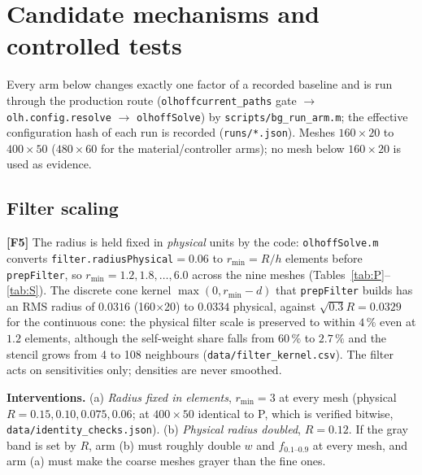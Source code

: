 \documentclass[10pt,a4paper]{article}
\newcommand{\fgray}{f_{0.1\text{--}0.9}}
\newcommand{\code}[1]{\texttt{\small #1}}
\newcommand{\fact}[1]{\textbf{[F#1]}}
\begin{document}
\section{Candidate mechanisms and controlled tests}\label{sec:mech}

Every arm below changes exactly one factor of a recorded baseline and is run through the production route (\code{olhoffcurrent\_paths} gate $\to$ \code{olh.config.resolve} $\to$ \code{olhoffSolve}) by \code{scripts/bg\_run\_arm.m}; the effective configuration hash of each run is recorded (\code{runs/*.json}). Meshes $160\times20$ to $400\times50$ ($480\times60$ for the material/controller arms); no mesh below $160\times20$ is used as evidence.

\subsection{Filter scaling}\label{sec:filter}
\fact{5} The radius is held fixed in \emph{physical} units by the code: \code{olhoffSolve.m} converts \code{filter.radiusPhysical}$=0.06$ to $r_{\min}=R/h$ elements before \code{prepFilter}, so $r_{\min}=1.2,1.8,\ldots,6.0$ across the nine meshes (Tables~\ref{tab:P}--\ref{tab:S}). The discrete cone kernel $\max(0,r_{\min}-d)$ that \code{prepFilter} builds has an RMS radius of $0.0316$ (160$\times$20) to $0.0334$ physical, against $\sqrt{0.3}R=0.0329$ for the continuous cone: the physical filter scale is preserved to within $4\,\%$ even at $1.2$ elements, although the self-weight share falls from $60\,\%$ to $2.7\,\%$ and the stencil grows from 4 to 108 neighbours (\code{data/filter\_kernel.csv}). The filter acts on sensitivities only; densities are never smoothed.
\par\noindent\textbf{Interventions.} (a) \emph{Radius fixed in elements}, $r_{\min}=3$ at every mesh (physical $R=0.15,0.10,0.075,0.06$; at $400\times50$ identical to P, which is verified bitwise, \code{data/identity\_checks.json}). (b) \emph{Physical radius doubled}, $R=0.12$. If the gray band is set by $R$, arm (b) must roughly double $w$ and $\fgray$ at every mesh, and arm (a) must make the coarse meshes grayer than the fine ones.
\end{document}
